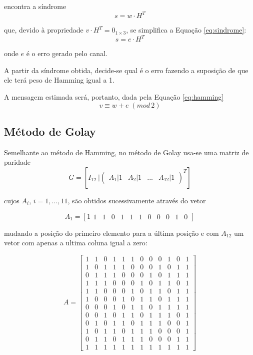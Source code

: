 \documentclass[%
aip,
jmp,%
amsmath,amssymb,
reprint,%
]{revtex4-1}
\begin{document}
	encontra a síndrome	
	\begin{equation}
		s = w\cdot H^{T}
	\end{equation}
	
	que, devido à propriedade $v\cdot H^{T}=0_{1\times3}$, se simplifica a Equação \ref{eq:sindrome}:	
	\begin{equation}
		s = e\cdot H^{T} \label{eq:sindrome}
	\end{equation}
	
	onde $e$ é o erro gerado pelo canal.
	
	A partir da síndrome obtida, decide-se qual é o erro fazendo a suposição de que ele terá peso de Hamming igual a 1.
	
	A mensagem estimada será, portanto, dada pela Equação \ref{eq:hamming}	
	\begin{equation}
		v \equiv w+e\; (mod\, 2) \label{eq:hamming}
	\end{equation}
	
	\subsection{Método de Golay}
	
	Semelhante ao método de Hamming, no método de Golay usa-se uma matriz de paridade
	\begin{equation}
	G = \left[I_{12}\:|\left(\begin{array}{cccc}
	A_1|1&A_2|1&...&A_{12}|1
	\end{array}\right)^{T}\right]
	\end{equation}
	
	cujos $A_{i}$, $i=1,...,11$, são obtidos sucessivamente através do vetor
	
	\begin{equation}
		A_1 = \left[1\begin{array}{ccccccccccc}
		1&1&0&1&1&1&0&0&0&1&0
		\end{array}\right]
	\end{equation}
	
	mudando a posição do primeiro elemento para a última posição e com $A_{12}$ um vetor com apenas a ultima coluna igual a zero:
	
	\begin{equation}
		A = \left[\begin{array}{cccccccccccc}
		1&1&0&1&1&1&0&0&0&1&0&1 \\
		1&0&1&1&1&0&0&0&1&0&1&1 \\
		0&1&1&1&0&0&0&1&0&1&1&1 \\
		1&1&1&0&0&0&1&0&1&1&0&1 \\
		1&1&0&0&0&1&0&1&1&0&1&1 \\
		1&0&0&0&1&0&1&1&0&1&1&1 \\
		0&0&0&1&0&1&1&0&1&1&1&1 \\
		0&0&1&0&1&1&0&1&1&1&0&1 \\
		0&1&0&1&1&0&1&1&1&0&0&1 \\
		1&0&1&1&0&1&1&1&0&0&0&1 \\
		0&1&1&0&1&1&1&0&0&0&1&1 \\
		1&1&1&1&1&1&1&1&1&1&1&1
		\end{array}
		\right]
	\end{equation}
	
\end{document}
